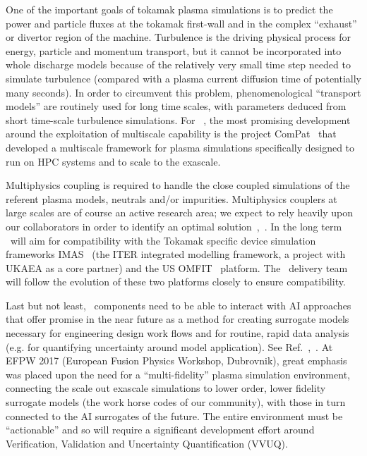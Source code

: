 \documentclass{article}
\begin{document}
One of the important goals of tokamak plasma simulations is to predict the power 
and particle fluxes at the tokamak first-wall and in the complex ``exhaust'' or 
divertor region of the machine. Turbulence is the driving physical process for 
energy, particle and momentum transport, but it cannot be incorporated into whole 
discharge models because of the relatively very small time step needed to simulate 
turbulence (compared with a plasma current diffusion time of potentially many seconds). 
In order to circumvent this problem, phenomenological ``transport models'' are 
routinely used for long time scales, with parameters deduced from short time-scale 
turbulence simulations. For \nep \  , the most promising development around the 
exploitation of multiscale capability is the project ComPat~\cite{sciplan} that developed 
a multiscale framework for plasma simulations specifically designed to run on HPC 
systems and to scale to the exascale.

Multiphysics coupling is required to handle the close coupled simulations of the 
referent plasma models, neutrals and/or impurities. Multiphysics couplers at large 
scales are of course an active research area; we expect to rely heavily upon our 
collaborators in order to identify an optimal solution~\cite{pappeqs},~\cite{ref:3}. In the long term 
\nep \   will aim for compatibility with the Tokamak specific device simulation 
frameworks IMAS~\cite{ref:4} (the ITER integrated modelling framework, a project with UKAEA 
as a core partner) and the US OMFIT~\cite{ref:5} platform. The \nep \   delivery team will 
follow the evolution of these two platforms closely to ensure compatibility.

Last but not least, \nep \   components need to be able to interact with AI approaches 
that offer promise in the near future as a method for creating surrogate models 
necessary for engineering design work flows and for routine, rapid data analysis 
(e.g. for quantifying uncertainty around model application). See Ref.~\cite{ref:6},~\cite{ref:7}. 
At EFPW 2017 (European Fusion Physics Workshop, Dubrovnik), great emphasis was 
placed upon the need for a ``multi-fidelity'' plasma simulation environment, connecting 
the scale out exascale simulations to lower order, lower fidelity surrogate models 
(the work horse codes of our community), with those in turn connected to the AI 
surrogates of the future. The entire environment must be ``actionable'' and so 
will require a significant development effort around Verification, Validation and 
Uncertainty Quantification (VVUQ).
\end{document}
